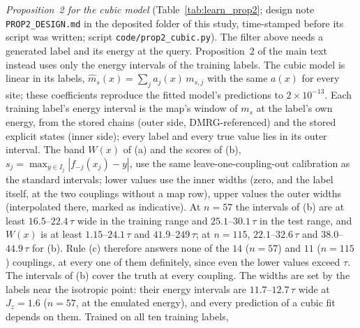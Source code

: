 \documentclass[aps,prx,onecolumn,10pt,nofootinbib,longbibliography,floatfix]{revtex4-2}
\theoremstyle{remark}
\newcommand{\Jz}{J_z}
\newcommand{\ms}{m_s}
\begin{document}
\emph{Proposition~2 for the cubic model} (Table~\ref{tab:learn_prop2}; design note %
\texttt{PROP2\_DESIGN.md} in the deposited folder of this study, time-stamped before its script was written; script
\texttt{code/\allowbreak prop2\_cubic.py}). The filter above needs a generated label and its energy at the query.
Proposition~2 of the main text instead uses only the energy intervals of the training labels. The cubic model is %
linear in its labels, $\hat m_s(x)=\sum_ja_j(x)\,m_{s,j}$ with the same $a(x)$ for every site; these coefficients
reproduce the fitted model's predictions to $2\times10^{-13}$. Each training label's energy interval is the map's window of $\ms$ at the %
label's own energy, from the stored chains (outer side, DMRG-referenced) and the stored explicit states (inner
side); every label and every true value lies in its outer interval. The band $W(x)$ of (a) and the scores of (b),
$s_j=\max_{y\in I_j}|f_{-j}(x_j)-y|$, use the same leave-one-coupling-out calibration as the standard intervals; lower
values use the inner widths (zero, and the label itself, at the two couplings without a map row), upper values the
outer widths (interpolated there, marked as indicative). At $n=57$ the intervals of (b) are at least %
$16.5$--$22.4\,\tau$ wide in the training range and $25.1$--$30.1\,\tau$ in the test range, and $W(x)$ is at least %
$1.15$--$24.1\,\tau$ and $41.9$--$249\,\tau$; at $n=115$, $22.1$--$32.6\,\tau$ and $38.0$--$44.9\,\tau$ for (b). Rule %
(c) therefore answers none of the $14$ ($n=57$) and $11$ ($n=115$) couplings, at every one of them definitely, %
since even the lower values exceed $\tau$. The intervals of (b) cover the truth at every coupling. The widths are set
by the labels near the isotropic point: their energy intervals are $11.7$--$12.7\,\tau$ wide at $\Jz=1.6$ ($n=57$, %
at the emulated energy), and every prediction of a cubic fit depends on them. Trained on all ten training labels,
\end{document}

